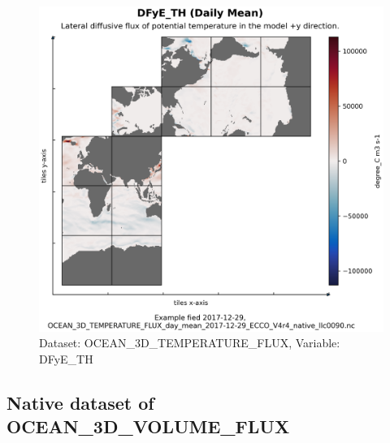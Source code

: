 \begin{figure}[H]
\centering
\includegraphics[scale=0.55]{../images/plots/native_plots/Ocean_Three-Dimensional_Potential_Temperature_Fluxes/DFyE_TH.png}
\caption{Dataset: OCEAN\_3D\_TEMPERATURE\_FLUX, Variable: DFyE\_TH}
\label{tab:table-OCEAN_3D_TEMPERATURE_FLUX_DFyE_TH-Plot}
\end{figure}
\subsection{Native dataset of OCEAN\_3D\_VOLUME\_FLUX}
\newp
